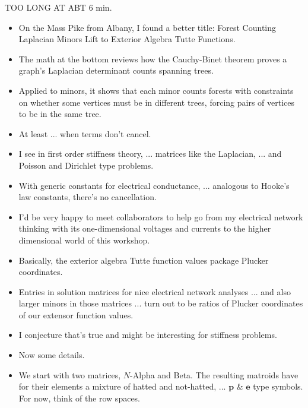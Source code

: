 \documentclass[14pt]{extarticle}
\begin{document}
TOO LONG AT ABT 6 min.


{\bf
  \begin{itemize}
  \item On the Mass Pike from Albany, I found a better title:  Forest Counting Laplacian
    Minors Lift to Exterior Algebra Tutte Functions.

  \item The math at the bottom reviews how the Cauchy-Binet theorem proves a graph's Laplacian
    determinant counts spanning trees.

  \item Applied to minors, it shows that each minor counts forests with
    constraints on whether some vertices must
    be in different trees, forcing pairs of vertices to be in the same tree.

    \item At least ... when terms don't cancel.

    \item I see in first order stiffness theory, ... matrices like the Laplacian, ...
      and Poisson and Dirichlet type problems.

      \item
    With generic constants for electrical conductance, ... analogous to Hooke's law constants, there's no
    cancellation.

  \item I'd be very happy to meet collaborators to help go from my electrical network
    thinking with its one-dimensional voltages and currents to the higher dimensional
    world of this workshop.

  \item Basically, the exterior algebra Tutte function values package Plucker coordinates.

  \item
    Entries in solution matrices for nice electrical network analyses ... and also larger minors
    in those matrices ... turn out to be ratios of Plucker coordinates of our extensor function
    values.

    \item I conjecture that's true and might be interesting for stiffness problems.
    
  \item Now some details.
      
  \item We start with two matrices, $N$-Alpha and Beta.  The resulting matroids
    have for their elements a mixture of hatted and not-hatted, ...  $\mathbf{p}$ \& $\mathbf{e}$ type
    symbols.
   For now, think of the row spaces.


\end{itemize}}
\end{document}
